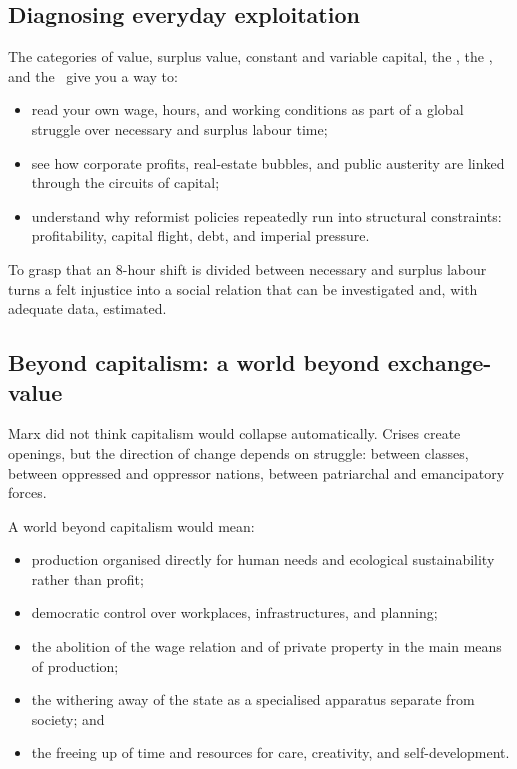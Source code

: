 \subsection{Diagnosing everyday exploitation}

The categories of value, surplus value, constant and variable capital,
the \profitratefull, the \organiccompfull, and the \TRPFfull\ give you a way to:

\begin{itemize}[leftmargin=1.5em]
  \item read your own wage, hours, and working conditions as part of a global
  struggle over necessary and surplus labour time;
  \item see how corporate profits, real-estate bubbles, and public austerity
  are linked through the circuits of capital;
  \item understand why reformist policies repeatedly run into structural
  constraints: profitability, capital flight, debt, and imperial pressure.
\end{itemize}

To grasp that an 8-hour shift is divided between necessary and surplus labour turns a
felt injustice into a social relation that can be investigated and, with adequate data,
estimated.

\subsection{Beyond capitalism: a world beyond exchange-value}

Marx did not think capitalism would collapse automatically. Crises create
openings, but the direction of change depends on struggle: between classes,
between oppressed and oppressor nations, between patriarchal and emancipatory
forces.

A world beyond capitalism would mean:

\begin{itemize}[leftmargin=1.5em]
  \item production organised directly for human needs and ecological
  sustainability rather than profit;
  \item democratic control over workplaces, infrastructures, and planning;
  \item the abolition of the wage relation and of private property in the
  main means of production;
  \item the withering away of the state as a specialised apparatus separate
  from society; and
  \item the freeing up of time and resources for care, creativity, and
  self-development.
\end{itemize}

